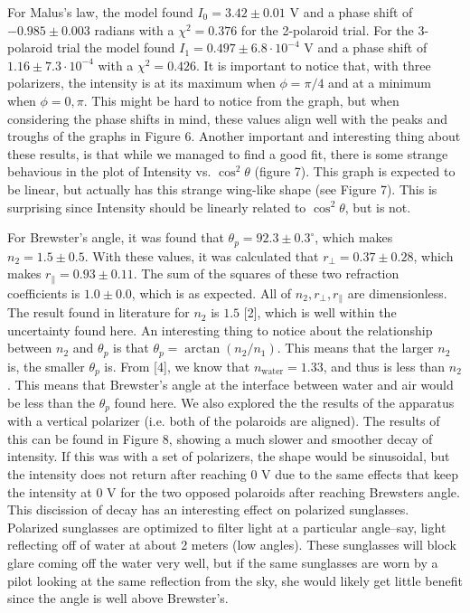 \documentclass[11pt]{article}
\begin{document}
\begin{multicols}{2}
     \selectfont

    For Malus's law, the model found $I_0 = 3.42 \pm 0.01$ V and a phase shift of $-0.985 \pm 0.003$ radians with a $\chi^2 = 0.376$ for the 2-polaroid trial. For the 3-polaroid trial the model found $I_1 = 0.497 \pm 6.8 \cdot 10^{-4}$ V and a phase shift of $1.16 \pm 7.3 \cdot 10^{-4}$ with a $\chi^2 = 0.426$.
    It is important to notice that, with three polarizers, the intensity is at its maximum when $\phi=\pi/4$ and at a minimum when $\phi= 0, \pi$. This might be hard to notice from the graph, but when considering the phase shifts in mind, these values align well with the peaks and troughs of the graphs in Figure 6.
    Another important and interesting thing about these results, is that while we managed to find a good fit, there is some strange behavious in the plot of Intensity vs. $\cos^2 \theta$ (figure 7). This graph is expected to be linear, but actually has this strange wing-like shape (see Figure 7). This is surprising since Intensity should be linearly related to $\cos^2 \theta$, but is not.

    For Brewster's angle, it was found that $\theta_p = 92.3 \pm 0.3 ^\circ$, which makes $n_2 = 1.5 \pm 0.5$. With these values, it was calculated that $r_\perp = 0.37 \pm 0.28$, which makes $r_\parallel = 0.93 \pm 0.11$. The sum of the squares of these two refraction coefficients is $1.0 \pm 0.0$, which is as expected. All of $n_2, r_\perp, r_\parallel$ are dimensionless.
    The result found in literature for $n_2$ is $1.5$ [2], which is well within the uncertainty found here. An interesting thing to notice about the relationship between $n_2$ and $\theta_p$ is that $\theta_p = \arctan(n_2/n_1)$. This means that the larger $n_2$ is, the smaller $\theta_p$ is. From [4], we know that $n_{\text{water}} = 1.33$, and thus is less than $n_2$. This means that Brewster's angle at the interface between water and air would be less than the $\theta_p$ found here.
    We also explored the the results of the apparatus with a vertical polarizer (i.e. both of the polaroids are aligned). The results of this can be found in Figure 8, showing a much slower and smoother decay of intensity. If this was with a set of polarizers, the shape would be sinusoidal, but the intensity does not return after reaching 0 V due to the same effects that keep the intensity at 0 V for the two opposed polaroids after reaching Brewsters angle.
    This discission of decay has an interesting effect on polarized sunglasses. Polarized sunglasses are optimized to filter light at a particular angle--say, light reflecting off of water at about 2 meters (low angles). These sunglasses will block glare coming off the water very well, but if the same sunglasses are worn by a pilot looking at the same reflection from the sky, she would likely get little benefit since the angle is well above Brewster's.  


\end{multicols}
\end{document}
